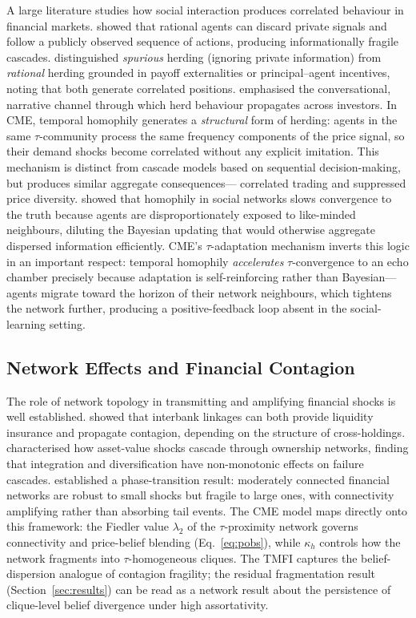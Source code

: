 \documentclass[10pt,twocolumn]{article}
\begin{document}
A large literature studies how social interaction produces correlated
behaviour in financial markets.  \cite{bikhchandani1992} showed that
rational agents can discard private signals and follow a publicly
observed sequence of actions, producing informationally fragile cascades.
\cite{devenow1996} distinguished \emph{spurious} herding (ignoring private
information) from \emph{rational} herding grounded in payoff externalities
or principal--agent incentives, noting that both generate correlated
positions.  \cite{shiller1995} emphasised the conversational, narrative
channel through which herd behaviour propagates across investors.  In CME,
temporal homophily generates a \emph{structural} form of herding: agents
in the same $\tau$-community process the same frequency components of the
price signal, so their demand shocks become correlated without any explicit
imitation.  This mechanism is distinct from cascade models based on
sequential decision-making, but produces similar aggregate consequences---
correlated trading and suppressed price diversity.
\cite{golub2010} showed that homophily in social networks slows convergence
to the truth because agents are disproportionately exposed to like-minded
neighbours, diluting the Bayesian updating that would otherwise aggregate
dispersed information efficiently.  CME's $\tau$-adaptation mechanism
inverts this logic in an important respect: temporal homophily
\emph{accelerates} $\tau$-convergence to an echo chamber precisely because
adaptation is self-reinforcing rather than Bayesian---agents migrate toward
the horizon of their network neighbours, which tightens the network further,
producing a positive-feedback loop absent in the social-learning setting.

\subsection{Network Effects and Financial Contagion}

The role of network topology in transmitting and amplifying financial
shocks is well established.  \cite{allen2000} showed that interbank
linkages can both provide liquidity insurance and propagate contagion,
depending on the structure of cross-holdings.  \cite{elliott2014}
characterised how asset-value shocks cascade through ownership networks,
finding that integration and diversification have non-monotonic effects
on failure cascades.  \cite{acemoglu2015} established a phase-transition
result: moderately connected financial networks are robust to small shocks
but fragile to large ones, with connectivity amplifying rather than
absorbing tail events.  The CME model maps directly onto this framework:
the Fiedler value $\lambda_2$ of the $\tau$-proximity network governs
connectivity and price-belief blending (Eq.~\eqref{eq:pobs}), while
$\kappa_h$ controls how the network fragments into $\tau$-homogeneous
cliques.  The TMFI captures the belief-dispersion analogue of contagion
fragility; the residual fragmentation result (Section~\ref{sec:results})
can be read as a network result about the persistence of clique-level
belief divergence under high assortativity.
\end{document}
